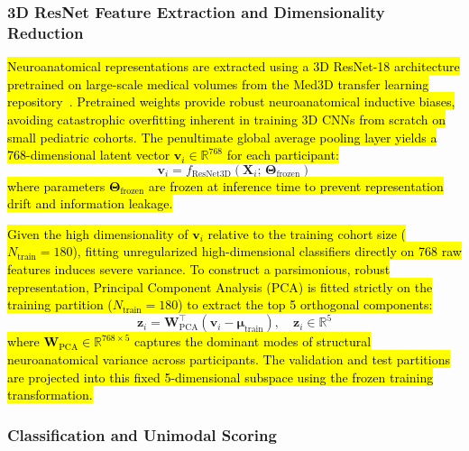 \documentclass[10pt,letterpaper]{article}
\begin{document}
        \subsubsection*{\textbf{3D ResNet Feature Extraction and Dimensionality Reduction}}

        \hl{Neuroanatomical representations are extracted using a 3D ResNet-18 architecture pretrained on large-scale medical volumes from the Med3D transfer learning repository~\cite{ref_med3d}. Pretrained weights provide robust neuroanatomical inductive biases, avoiding catastrophic overfitting inherent in training 3D CNNs from scratch on small pediatric cohorts. The penultimate global average pooling layer yields a 768-dimensional latent vector $\mathbf{v}_i \in \mathbb{R}^{768}$ for each participant:}
        \begin{equation} \label{eq:mri_feature}
        \mathbf{v}_i = f_{\text{ResNet3D}}(\mathbf{X}_i;\,\boldsymbol{\Theta}_{\text{frozen}})
        \end{equation}
        \hl{where parameters $\boldsymbol{\Theta}_{\text{frozen}}$ are frozen at inference time to prevent representation drift and information leakage.}

        \hl{Given the high dimensionality of $\mathbf{v}_i$ relative to the training cohort size ($N_{\text{train}} = 180$), fitting unregularized high-dimensional classifiers directly on 768 raw features induces severe variance. To construct a parsimonious, robust representation, Principal Component Analysis (PCA) is fitted strictly on the training partition ($N_{\text{train}} = 180$) to extract the top 5 orthogonal components:}
        \begin{equation} \label{eq:pca_proj}
        \mathbf{z}_i = \mathbf{W}_{\text{PCA}}^\top (\mathbf{v}_i - \boldsymbol{\mu}_{\text{train}}),\quad \mathbf{z}_i \in \mathbb{R}^5
        \end{equation}
        \hl{where $\mathbf{W}_{\text{PCA}} \in \mathbb{R}^{768 \times 5}$ captures the dominant modes of structural neuroanatomical variance across participants. The validation and test partitions are projected into this fixed 5-dimensional subspace using the frozen training transformation.}

        \subsubsection*{\textbf{Classification and Unimodal Scoring}}
\end{document}

